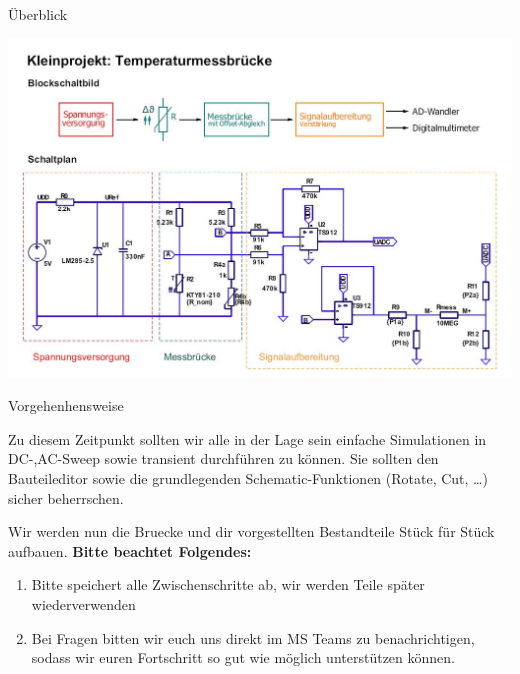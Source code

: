 \begin{frame}[t]{Überblick} 
    
    \begin{spacing}{0.9} \begin{tiny}
        \begin{minipage}{\textwidth}
          \includegraphics[width=\linewidth]{pictures/projekt_overview.jpg}
        \end{minipage} 
    \end{tiny} \end{spacing}

\end{frame}

\begin{frame}[t]{Vorgehenhensweise} 
    
    Zu diesem Zeitpunkt sollten wir alle in der Lage sein einfache Simulationen in DC-,AC-Sweep sowie transient
    durchführen zu können. Sie sollten den Bauteileditor sowie die grundlegenden Schematic-Funktionen (Rotate, Cut, \dots) 
    sicher beherrschen. 

    Wir werden nun die Bruecke und dir vorgestellten Bestandteile Stück für Stück aufbauen. 
    \textbf{Bitte beachtet Folgendes:}

    \begin{enumerate}
        \item Bitte speichert alle Zwischenschritte ab, wir werden Teile später wiederverwenden
        \item Bei Fragen bitten wir euch uns direkt im MS Teams zu benachrichtigen, sodass wir euren
        Fortschritt so gut wie möglich unterstützen können. 
    \end{enumerate}
\end{frame}
